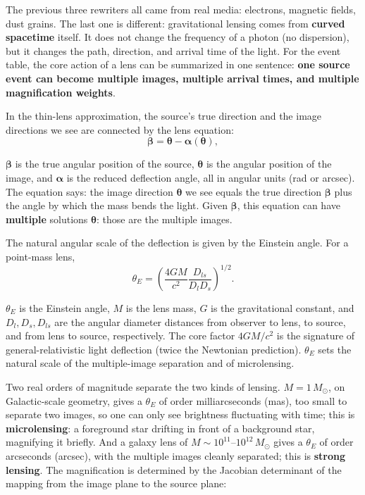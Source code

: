 The previous three rewriters all came from real media: electrons, magnetic fields, dust grains. The last one is different: gravitational lensing comes from \textbf{curved spacetime} itself. It does not change the frequency of a photon (no dispersion), but it changes the path, direction, and arrival time of the light. For the event table, the core action of a lens can be summarized in one sentence: \textbf{one source event can become multiple images, multiple arrival times, and multiple magnification weights}.

In the thin-lens approximation, the source's true direction and the image directions we see are connected by the lens equation:
\begin{equation}
  {\boldsymbol\beta}
  =
  {\boldsymbol\theta}
  -
  {\boldsymbol\alpha}({\boldsymbol\theta}),
  \label{eq:e21-lens-equation}
\end{equation}
\begin{formulaexplain}
\({\boldsymbol\beta}\) is the true angular position of the source, \({\boldsymbol\theta}\) is the angular position of the image, and \({\boldsymbol\alpha}\) is the reduced deflection angle, all in angular units (rad or arcsec). The equation says: the image direction \({\boldsymbol\theta}\) we see equals the true direction \({\boldsymbol\beta}\) plus the angle by which the mass bends the light. Given \({\boldsymbol\beta}\), this equation can have \textbf{multiple} solutions \({\boldsymbol\theta}\): those are the multiple images.
\end{formulaexplain}
The natural angular scale of the deflection is given by the Einstein angle. For a point-mass lens,
\begin{equation}
  \theta_E
  =
  \left(
  \frac{4GM}{c^2}
  \frac{D_{ls}}{D_lD_s}
  \right)^{1/2}.
  \label{eq:e21-einstein-angle}
\end{equation}
\begin{formulaexplain}
\(\theta_E\) is the Einstein angle, \(M\) is the lens mass, \(G\) is the gravitational constant, and \(D_l,D_s,D_{ls}\) are the angular diameter distances from observer to lens, to source, and from lens to source, respectively. The core factor \(4GM/c^2\) is the signature of general-relativistic light deflection (twice the Newtonian prediction). \(\theta_E\) sets the natural scale of the multiple-image separation and of microlensing.
\end{formulaexplain}
Two real orders of magnitude separate the two kinds of lensing. \(M=1\,M_\odot\), on Galactic-scale geometry, gives a \(\theta_E\) of order milliarcseconds (mas), too small to separate two images, so one can only see brightness fluctuating with time; this is \textbf{microlensing}: a foreground star drifting in front of a background star, magnifying it briefly. And a galaxy lens of \(M\sim10^{11}\text{--}10^{12}\,M_\odot\) gives a \(\theta_E\) of order arcseconds (arcsec), with the multiple images cleanly separated; this is \textbf{strong lensing}. The magnification is determined by the Jacobian determinant of the mapping from the image plane to the source plane:
